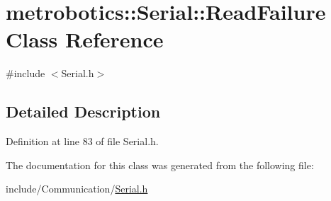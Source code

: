 \hypertarget{classmetrobotics_1_1Serial_1_1ReadFailure}{\section{metrobotics\-:\-:\-Serial\-:\-:\-Read\-Failure \-Class \-Reference}
\label{classmetrobotics_1_1Serial_1_1ReadFailure}
}


{\ttfamily \#include $<$\-Serial.\-h$>$}



\subsection{\-Detailed \-Description}


\-Definition at line 83 of file \-Serial.\-h.



\-The documentation for this class was generated from the following file\-:\begin{DoxyCompactItemize}
\item 
include/\-Communication/\hyperlink{Serial_8h}{\-Serial.\-h}\end{DoxyCompactItemize}
